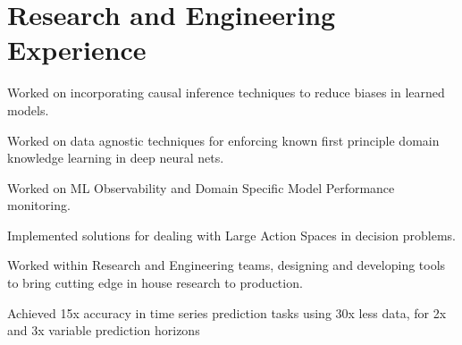 \documentclass[]{raahul_singh_resume}
\begin{document}
\begin{minipage}[t]{0.66\textwidth} 

\section{Research and Engineering Experience}
\vspace{\topsep}
\begin{tightemize}
        \item {Worked on incorporating causal inference techniques to reduce biases in learned models.}
        \item {Worked on data agnostic techniques for enforcing known first principle domain knowledge learning in deep neural nets.}
        \item {Worked on ML Observability and Domain Specific Model Performance monitoring.}
        \item {Implemented solutions for dealing with Large Action Spaces in decision problems.}
        \item {Worked within Research and Engineering teams, designing and developing tools to bring cutting edge in house research to production.}
        \item {Achieved 15x accuracy in time series prediction tasks using 30x less data, for 2x and 3x variable prediction horizons}
\end{tightemize}
\sectionsep

\sectionsep


\end{minipage}
\end{document}
